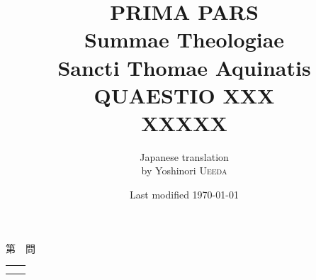 \documentclass[paper=a4paper,fontsize=10pt,jafontsize=9pt,titlepage]{jlreq}
\title{{\bfseries PRIMA PARS}\\{\Huge Summae Theologiae}\\Sancti Thomae
Aquinatis\\{\sffamily QUAESTIO XXX}\\XXXXX}
\author{Japanese translation\\by Yoshinori {\scshape Ueeda}}
\date{Last modified \today}
\begin{document}
\maketitle
\pagestyle{fancy}

\begin{center}
{\Large 第　問\\}
\end{center}

\begin{longtable}{p{21em}p{21em}}


&



\\

&


\end{longtable}

\newpage
\end{document}
